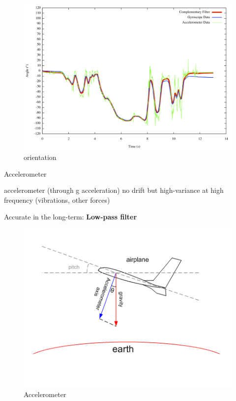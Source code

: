 \begin{frame}{}

\begin{figure}
\centering
\includegraphics{cf.png}
\caption{orientation}
\end{figure}

\end{frame}

\begin{frame}{Accelerometer}

accelerometer (through g acceleration) no drift but high-variance at
high frequency (vibrations, other forces)

Accurate in the long-term: \textbf{Low-pass filter}

\begin{figure}
\centering
\includegraphics{accelero.png}
\caption{Accelerometer}
\end{figure}

\end{frame}

